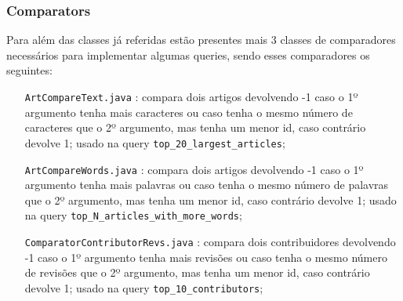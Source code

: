 \documentclass[a4paper,11pt]{article}
\begin{document}
\subsubsection{Comparators}
Para além das classes já referidas estão presentes mais 3 classes de comparadores necessários para implementar algumas queries, sendo esses comparadores os seguintes:
\begin{itemize}[align=left]
\item[\texttt{ArtCompareText.java}]: compara dois artigos devolvendo -1 caso o 1º argumento tenha mais caracteres ou caso tenha o mesmo número de caracteres que o 2º argumento, mas tenha um menor id, caso contrário devolve 1; usado na query \texttt{top\_20\_largest\_articles};
\item[\texttt{ArtCompareWords.java}]: compara dois artigos devolvendo -1 caso o 1º argumento tenha mais palavras ou caso tenha o mesmo número de palavras que o 2º argumento, mas tenha um menor id, caso contrário devolve 1; usado na query \texttt{top\_N\_articles\_with\_more\_words};
\item[\texttt{ComparatorContributorRevs.java}]: compara dois contribuidores devolvendo -1 caso o 1º argumento tenha mais revisões ou caso tenha o mesmo número de revisões que o 2º argumento, mas tenha um menor id, caso contrário devolve 1; usado na query \texttt{top\_10\_contributors};
\end{itemize}
\end{document}
